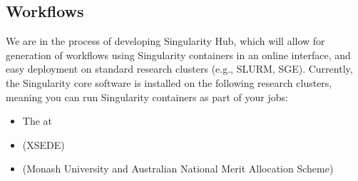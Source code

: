 \documentclass[letterpaper,10pt,english]{sphinxmanual}
\begin{document}
\subsection{Workflows}
\label{\detokenize{installation_environments:workflows}}
We are in the process of developing Singularity Hub, which will allow
for generation of workflows using Singularity containers in an online
interface, and easy deployment on standard research clusters (e.g.,
SLURM, SGE). Currently, the Singularity core software is installed on
the following research clusters, meaning you can run Singularity
containers as part of your jobs:
\begin{itemize}
\item {} 
The  at 

\item {} 
 (XSEDE)

\item {} 
(Monash University and Australian National Merit Allocation Scheme)

\end{itemize}
\end{document}
